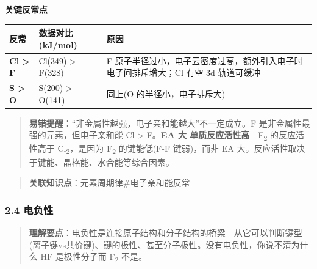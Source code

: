 \textbf{关键反常点}

{\def\LTcaptype{none} %
\begin{longtable}[]{@{}
  >{\raggedright\arraybackslash}p{}
  >{\raggedright\arraybackslash}p{}
  >{\raggedright\arraybackslash}p{}@{}}
\toprule\noalign{}
\begin{minipage}[b]{\linewidth}\raggedright
反常
\end{minipage} & \begin{minipage}[b]{\linewidth}\raggedright
数据对比 (kJ/mol)
\end{minipage} & \begin{minipage}[b]{\linewidth}\raggedright
原因
\end{minipage} \\
\midrule\noalign{}
\endhead
\bottomrule\noalign{}
\endlastfoot
\textbf{Cl \textgreater{} F} & Cl(349) \textgreater{} F(328) & F 原子半径过小，电子云密度过高，额外引入电子时电子间排斥增大；Cl 有空 3d 轨道可缓冲 \\
\textbf{S \textgreater{} O} & S(200) \textgreater{} O(141) & 同上(O 的半径小，电子排斥大) \\
\end{longtable}
}

\begin{quote}
\textbf{易错提醒}：``非金属性越强，电子亲和能越大''不一定成立。F 是非金属性最强的元素，但电子亲和能 Cl \textgreater{} F。\textbf{EA 大  单质反应活性高}---F\textsubscript{2} 的反应活性高于 Cl\textsubscript{2}，是因为 F\textsubscript{2} 的键能低(F-F 键弱)，而非 EA 大。反应活性取决于键能、晶格能、水合能等综合因素。
\end{quote}

\begin{quote}
\textbf{关联知识点}：元素周期律\#电子亲和能反常
\end{quote}

\subsubsection{2.4 电负性}\label{ux7535ux8d1fux6027}

\begin{quote}
\textbf{理解要点}：电负性是连接原子结构和分子结构的桥梁---从它可以判断键型(离子键vs共价键)、键的极性、甚至分子极性。没有电负性，你说不清为什么 HF 是极性分子而 F\textsubscript{2} 不是。
\end{quote}

